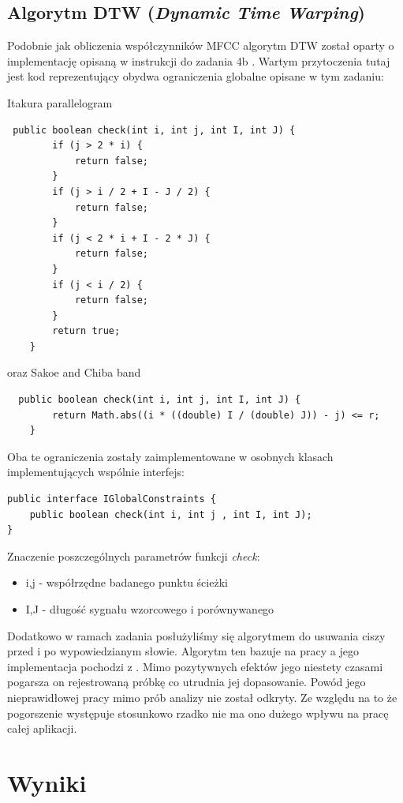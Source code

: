 \documentclass{classrep}
\begin{document}
\subsection{Algorytm DTW (\textit{Dynamic Time Warping})}
Podobnie jak obliczenia współczynników MFCC algorytm DTW został oparty o implementację opisaną w instrukcji do zadania 4b \cite{1}. Wartym przytoczenia tutaj jest kod reprezentujący obydwa ograniczenia globalne opisane w tym zadaniu:

Itakura parallelogram
\begin{lstlisting}
 public boolean check(int i, int j, int I, int J) {
        if (j > 2 * i) {
            return false;
        }
        if (j > i / 2 + I - J / 2) {
            return false;
        }
        if (j < 2 * i + I - 2 * J) {
            return false;
        }
        if (j < i / 2) {
            return false;
        }
        return true;
    }
\end{lstlisting}

oraz Sakoe and Chiba band
\begin{lstlisting}
  public boolean check(int i, int j, int I, int J) {
        return Math.abs((i * ((double) I / (double) J)) - j) <= r;
    }
\end{lstlisting}

Oba te ograniczenia zostały zaimplementowane w osobnych klasach implementujących wspólnie interfejs:
\begin{lstlisting}
public interface IGlobalConstraints {
    public boolean check(int i, int j , int I, int J);
}
\end{lstlisting}
Znaczenie poszczególnych parametrów funkcji \textit{check}:
\begin{itemize}
\item i,j - współrzędne badanego punktu ścieżki
\item I,J - długość sygnału wzorcowego i porównywanego
\end{itemize}

Dodatkowo w ramach zadania posłużyliśmy się algorytmem do usuwania ciszy przed i po wypowiedzianym słowie. Algorytm ten bazuje na pracy \cite{2} a jego implementacja pochodzi z \cite{3}. Mimo pozytywnych efektów jego niestety czasami pogarsza on rejestrowaną próbkę co utrudnia jej dopasowanie. Powód jego nieprawidłowej pracy mimo prób analizy nie został odkryty. Ze względu na to że pogorszenie występuje stosunkowo rzadko nie ma ono dużego wpływu na pracę całej aplikacji.

\section{Wyniki}
\end{document}
